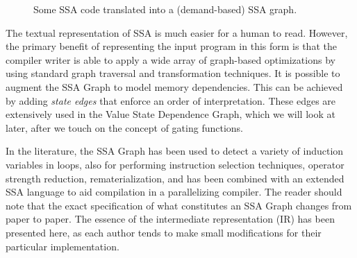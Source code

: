 \begin{figure}[ht]
\centering
{}

\caption{Some SSA code translated into a (demand-based) SSA graph.}
\label{fig: ssa-graph-example-code}
\end{figure}

The textual representation of SSA is much easier for a human to read. 
However, the primary benefit of representing the input program in this form is that the compiler writer is able to apply a wide array of graph-based optimizations by using standard graph traversal and transformation techniques. 
It is possible to augment the SSA Graph to model memory dependencies. 
This can be achieved by adding \textit{state edges} that enforce an order of interpretation. 
These edges are extensively used in the Value State Dependence Graph, which we will look at later, after we touch on the concept of gating functions.

In the literature, the SSA Graph has been used to detect a variety of induction variables in loops, also for performing instruction selection techniques, operator strength reduction, rematerialization, and has been combined with an extended SSA language to aid compilation in a parallelizing compiler. 
The reader should note that the exact specification of what constitutes an SSA Graph changes from paper to paper. 
The essence of the intermediate representation (IR) has been presented here, as each author tends to make small modifications for their particular implementation.

